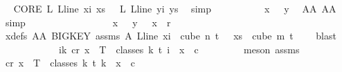 \begin{isabellebody}
\ \isamarkupfalse%
\ CORE{\isacharcolon}{\kern0pt}\ {\isachardoublequoteopen}{\isasymchi}L\ {\isacharparenleft}{\kern0pt}L{\isacharunderscore}{\kern0pt}line\ xi{\isacharparenright}{\kern0pt}\ xs\ {\isacharequal}{\kern0pt}\ \ {\isasymchi}L\ {\isacharparenleft}{\kern0pt}L{\isacharunderscore}{\kern0pt}line\ yi{\isacharparenright}{\kern0pt}\ ys{\isachardoublequoteclose}\ \isamarkupfalse%
\ simp\isanewline
\isanewline
\isanewline
\ \ \ \ \ \ \isamarkupfalse%
\ \isamarkupfalse%
\ {\isachardoublequoteopen}{\isasymchi}\ x\ {\isacharequal}{\kern0pt}\ {\isasymchi}\ y{\isachardoublequoteclose}\ \isamarkupfalse%
\ AA{}\ AA{}\ \isamarkupfalse%
\ simp\ \ \ \ \ \ \isanewline
\ \ \ \ \ \ \isamarkupfalse%
\ \isamarkupfalse%
\ {\isachardoublequoteopen}\ {\isasymchi}\ x\ {\isacharequal}{\kern0pt}\ {\isasymchi}\ y\ {\isasymand}\ {\isasymchi}\ x\ {\isacharless}{\kern0pt}\ r{\isachardoublequoteclose}\ \isamarkupfalse%
\ xdefs\ AA{}\ BIGKEY\ assms{\isacharparenleft}{\kern0pt}{}{\isacharparenright}{\kern0pt}\ A\ {\isacartoucheopen}L{\isacharunderscore}{\kern0pt}line\ xi\ {\isasymin}\ cube\ n\ {\isacharparenleft}{\kern0pt}t\ {\isacharplus}{\kern0pt}\ {}{\isacharparenright}{\kern0pt}{\isacartoucheclose}\ {\isacartoucheopen}xs\ {\isasymin}\ cube\ m\ {\isacharparenleft}{\kern0pt}t\ {\isacharplus}{\kern0pt}\ {}{\isacharparenright}{\kern0pt}{\isacartoucheclose}\ \isamarkupfalse%
\ blast\isanewline
\ \ \ \ \isamarkupfalse%
\isanewline
\ \ \ \ \isamarkupfalse%
\ \isamarkupfalse%
\ {\isachardoublequoteopen}{\isasymforall}i{\isasymle}k{\isachardot}{\kern0pt}\ {\isasymexists}c{\isacharless}{\kern0pt}r{\isachardot}{\kern0pt}\ {\isasymforall}x\ {\isasymin}\ T\ {\isacharbackquote}{\kern0pt}\ classes\ {\isacharparenleft}{\kern0pt}k{\isacharplus}{\kern0pt}{}{\isacharparenright}{\kern0pt}\ t\ i{\isachardot}{\kern0pt}\ {\isasymchi}\ x\ {\isacharequal}{\kern0pt}\ c{\isachardoublequoteclose}\ \isanewline
\ \ \ \ \ \ \isamarkupfalse%
\ {\isacharparenleft}{\kern0pt}meson\ assms{\isacharparenleft}{\kern0pt}{}{\isacharparenright}{\kern0pt}{\isacharparenright}{\kern0pt}\isanewline
\isanewline
\ \ \ \ \isamarkupfalse%
\ {\isachardoublequoteopen}{\isasymexists}c{\isacharless}{\kern0pt}r{\isachardot}{\kern0pt}\ {\isasymforall}x\ {\isasymin}\ T\ {\isacharbackquote}{\kern0pt}\ classes\ {\isacharparenleft}{\kern0pt}k{\isacharplus}{\kern0pt}{}{\isacharparenright}{\kern0pt}\ t\ {\isacharparenleft}{\kern0pt}k{\isacharplus}{\kern0pt}{}{\isacharparenright}{\kern0pt}{\isachardot}{\kern0pt}\ {\isasymchi}\ x\ {\isacharequal}{\kern0pt}\ c{\isachardoublequoteclose}\isanewline

\end{isabellebody}
